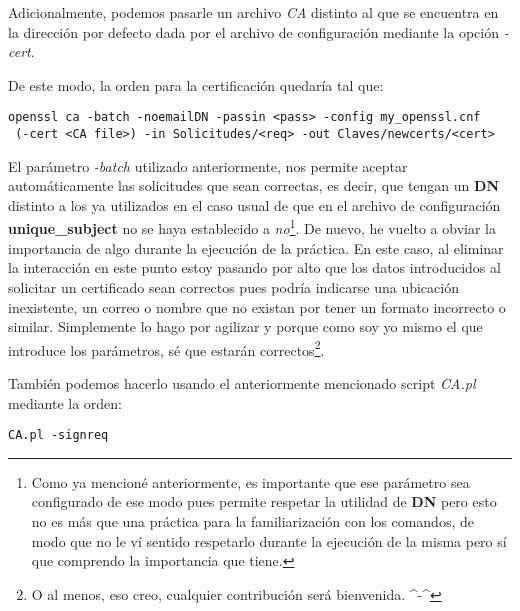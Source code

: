 \documentclass[a4paper, 11pt]{article}
\begin{document}
		Adicionalmente, podemos pasarle un archivo \textit{CA} distinto al que se encuentra en la dirección por defecto dada
		por el archivo de configuración mediante la opción \textit{-cert}.
		
		De este modo, la orden para la certificación quedaría tal que:\\		
		\begin{small}
			\verb|openssl ca -batch -noemailDN -passin <pass> -config my_openssl.cnf|\\
			\verb| (-cert <CA file>) -in Solicitudes/<req> -out Claves/newcerts/<cert>|\\
		\end{small}

		El parámetro \textit{-batch} utilizado anteriormente, nos permite aceptar automáticamente las solicitudes que sean
		correctas, es decir, que tengan un \textbf{DN} distinto a los ya utilizados en el caso usual de que en el archivo de
		configuración \textbf{unique\_subject} no se haya establecido a \textit{no}\footnote{Como ya mencioné anteriormente,
		es importante que ese parámetro sea configurado de ese modo pues permite respetar la utilidad de \textbf{DN} pero
		esto no es más que una práctica para la familiarización con los comandos, de modo que no le ví sentido respetarlo
		durante la ejecución de la misma pero sí que comprendo la importancia que tiene.}. De nuevo, he vuelto a obviar la
		importancia de algo durante la ejecución de la práctica. En este caso, al eliminar la interacción en este punto estoy
		pasando por alto que los datos introducidos al solicitar un certificado sean correctos pues podría indicarse una
		ubicación inexistente, un correo o nombre que no existan por tener un formato incorrecto o similar. Simplemente lo
		hago por agilizar y porque como soy yo mismo el que introduce los parámetros, sé que estarán correctos\footnote{O
		al menos, eso creo, cualquier contribución será bienvenida. \textasciicircum-\textasciicircum}.

		También podemos hacerlo usando el anteriormente mencionado script \textit{CA.pl} mediante la orden:\\
		\begin{small}
			\verb|CA.pl -signreq|\\
		\end{small}
		
\end{document}
